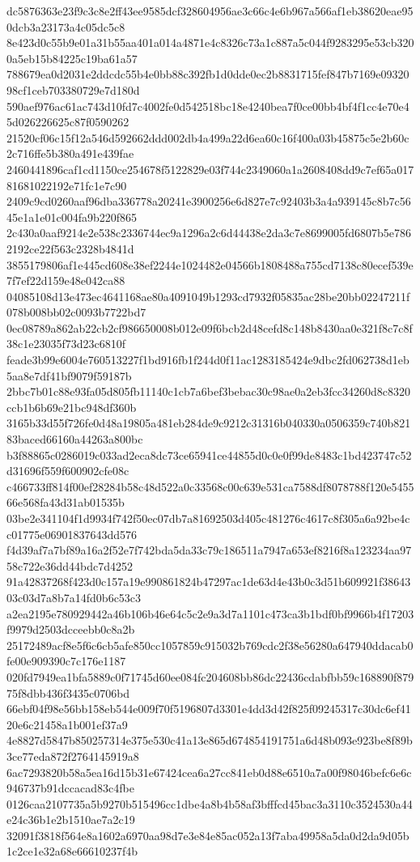 {dc5876363e23f9c3c8e2ff43ee9585dcf328604956ae3c66c4e6b967a566af1eb38620eae950dcb3a23173a4c05dc5c8
8e423d0c55b9e01a31b55aa401a014a4871e4c8326c73a1c887a5c044f9283295e53cb3200a5eb15b84225c19ba61a57
788679ea0d2031e2ddcdc55b4e0bb88c392fb1d0dde0ec2b8831715fef847b7169e0932098cf1ceb703380729e7d180d
590aef976ac61ac743d10fd7c4002fe0d542518bc18e4240bea7f0ce00bb4bf4f1cc4e70e45d026226625c87f0590262
21520cf06c15f12a546d592662ddd002db4a499a22d6ea60c16f400a03b45875c5e2b60c2c716ffe5b380a491e439fae
2460441896caf1cd1150ce254678f5122829e03f744c2349060a1a2608408dd9c7ef65a01781681022192e71fc1e7c90
2409c9cd0260aaf96dba336778a20241e3900256e6d827e7c92403b3a4a939145c8b7c5645e1a1e01c004fa9b220f865
2c430a0aaf9214e2e538c2336744ec9a1296a2c6d44438e2da3c7e8699005fd6807b5e7862192ce22f563c2328b4841d
3855179806af1e445cd608e38ef2244e1024482e04566b1808488a755cd7138c80ecef539e7f7ef22d159e48e042ca88
04085108d13e473ec4641168ae80a4091049b1293cd7932f05835ac28be20bb02247211f078b008bb02c0093b7722bd7
0ec08789a862ab22cb2cf986650008b012e09f6bcb2d48cefd8c148b8430aa0e321f8c7c8f38c1e23035f73d23c6810f
feade3b99e6004e760513227f1bd916fb1f244d0f11ac1283185424e9dbc2fd062738d1eb5aa8e7df41bf9079f59187b
2bbc7b01c88e93fa05d805fb11140c1cb7a6bef3bebac30c98ae0a2eb3fcc34260d8c8320ccb1b6b69e21bc948df360b
3165b33d55f726fe0d48a19805a481eb284de9c9212c31316b040330a0506359c740b82183baced66160a44263a800bc
b3f88865c0286019c033ad2eca8dc73ce65941ce44855d0c0e0f99de8483c1bd423747c52d31696f559f600902cfe08c
c466733ff814f00ef28284b58c48d522a0c33568c00c639e531ca7588df8078788f120e545566e568fa43d31ab01535b
03be2e341104f1d9934f742f50ec07db7a81692503d405c481276c4617c8f305a6a92be4cc01775e06901837643dd576
f4d39af7a7bf89a16a2f52e7f742bda5da33c79c186511a7947a653ef8216f8a123234aa9758c722e36dd44bdc7d4252
91a42837268f423d0c157a19e990861824b47297ac1de63d4e43b0c3d51b609921f3864303c03d7a8b7a14fd0b6c53c3
a2ea2195e780929442a46b106b46e64c5c2e9a3d7a1101c473ca3b1bdf0bf9966b4f17203f9979d2503dcceebb0c8a2b
25172489acf8e5f6c6cb5afe850cc1057859c915032b769cdc2f38e56280a647940ddacab0fe00e909390c7c176e1187
020fd7949ea1bfa5889c0f71745d60ee084fc204608bb86dc22436cdabfbb59c168890f87975f8dbb436f3435c0706bd
66ebf04f98e56bb158eb544e009f70f5196807d3301e4dd3d42f825f09245317c30dc6ef4120e6c21458a1b001ef37a9
4e8827d5847b850257314e375e530c41a13e865d674854191751a6d48b093e923be8f89b3ce77eda872f2764145919a8
6ac7293820b58a5ea16d15b31e67424cea6a27cc841eb0d88e6510a7a00f98046befc6e6c946737b91dccacad83c4fbe
0126caa2107735a5b9270b515496cc1dbe4a8b4b58af3bfffcd45bac3a3110c3524530a44e24c36b1e2b1510ae7a2c19
32091f3818f564e8a1602a6970aa98d7e3e84e85ac052a13f7aba49958a5da0d2da9d05b1c2ce1e32a68e66610237f4b
}
